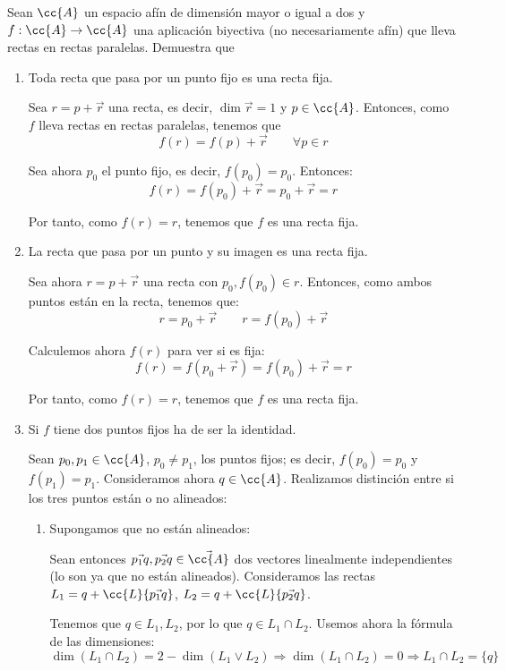 \begin{ejercicio}
    Sean $\cc{A}$ un espacio afín de dimensión mayor o igual a dos y $f : \cc{A} \to \cc{A}$ una aplicación biyectiva (no necesariamente afín) que lleva rectas en rectas paralelas. Demuestra que
    \begin{enumerate}
        \item Toda recta que pasa por un punto fijo es una recta fija.

        Sea $r=p+\vec{r}$ una recta, es decir, $\dim \vec{r}=1$ y $p\in \cc{A}$. Entonces, como $f$ lleva rectas en rectas paralelas, tenemos que $$f(r)=f(p)+\vec{r} \qquad \forall p\in r$$

        Sea ahora $p_0$ el punto fijo, es decir, $f(p_0)=p_0$. Entonces:
        $$f(r)=f(p_0)+\vec{r}=p_0+\vec{r}=r$$

        Por tanto, como $f(r)=r$, tenemos que $f$ es una recta fija.

        
        \item La recta que pasa por un punto y su imagen es una recta fija.

        Sea ahora $r=p+\vec{r}$ una recta con $p_0,f(p_0)\in r$. Entonces, como ambos puntos están en la recta, tenemos que:
        $$r=p_0+\vec{r} \qquad r=f(p_0)+\vec{r}$$

        Calculemos ahora $f(r)$ para ver si es fija:
        \begin{equation*}
            f(r)=f(p_0+\vec{r})=f(p_0)+\vec{r}=r
        \end{equation*}

        Por tanto, como $f(r)=r$, tenemos que $f$ es una recta fija.
        
        \item Si $f$ tiene dos puntos fijos ha de ser la identidad.

        Sean $p_0,p_1\in \cc{A}$, $p_0\neq p_1$, los puntos fijos; es decir, $f(p_0)=p_0$ y $f(p_1)=p_1$. Consideramos ahora $q\in \cc{A}$. Realizamos distinción entre si los tres puntos están o no alineados:
        \begin{enumerate}
            \item Supongamos que no están alineados:

            Sean entonces $\vec{p_1q}, \vec{p_2q}\in \vec{\cc{A}}$ dos vectores linealmente independientes (lo son ya que no están alineados). Consideramos las rectas $L_1 = q+\cc{L}\{\vec{p_1q}\}$, $L_2 = q+\cc{L}\{\vec{p_2q}\}$.

            Tenemos que $q\in L_1,L_2$, por lo que $q\in L_1\cap L_2$. Usemos ahora la fórmula de las dimensiones:
            \begin{equation*}
                \dim (L_1\cap L_2) = 2-\dim (L_1\vee L_2) \Longrightarrow \dim (L_1\cap L_2) = 0 \Longrightarrow L_1\cap L_2 = \{q\}
            \end{equation*}


\end{enumerate}
\end{enumerate}
\end{ejercicio}
